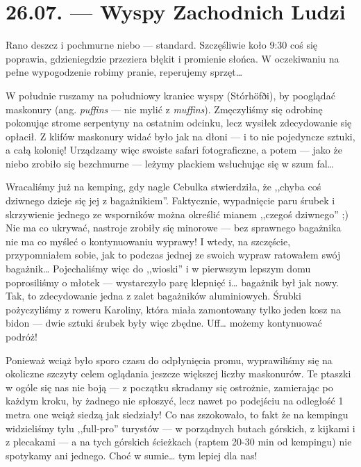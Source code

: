 \chapter*{26.07. --- Wyspy Zachodnich Ludzi}

Rano deszcz i pochmurne niebo --- standard. Szczęśliwie koło 9:30 coś się poprawia, gdzieniegdzie przeziera błękit i promienie słońca. W oczekiwaniu na pełne wypogodzenie robimy pranie, reperujemy sprzęt…


W południe ruszamy na południowy kraniec wyspy (Stórhöfði), by pooglądać maskonury (ang. \emph{puffins} --- nie mylić z \emph{muffins}). Zmęczyliśmy się odrobinę pokonując strome serpentyny na ostatnim odcinku, lecz wysiłek zdecydowanie się opłacił. Z klifów maskonury widać było jak na dłoni --- i to nie pojedyncze sztuki, a całą kolonię! Urządzamy więc swoiste safari fotograficzne, a potem --- jako że niebo zrobiło się bezchmurne --- leżymy plackiem wsłuchując się w szum fal…

Wracaliśmy już na kemping, gdy nagle Cebulka stwierdziła, że ,,chyba coś dziwnego dzieje się jej z bagażnikiem''. Faktycznie, wypadnięcie paru śrubek i skrzywienie jednego ze wsporników można określić mianem ,,czegoś dziwnego'' ;) Nie ma co ukrywać, nastroje zrobiły się minorowe --- bez sprawnego bagażnika nie ma co myśleć o kontynuowaniu wyprawy! I wtedy, na szczęście, przypomniałem sobie, jak to podczas jednej ze swoich wypraw ratowałem swój bagażnik… Pojechaliśmy więc do ,,wioski'' i  w pierwszym lepszym domu poprosiliśmy o młotek --- wystarczyło parę klepnięć i… bagażnik był jak nowy. Tak, to zdecydowanie jedna z zalet bagażników aluminiowych. Śrubki pożyczyliśmy z roweru Karoliny, która miała zamontowany tylko jeden kosz na bidon --- dwie sztuki śrubek były więc zbędne. Uff… możemy kontynuować podróż!

Ponieważ wciąż było sporo czasu do odpłynięcia promu, wyprawiliśmy się na okoliczne szczyty celem oglądania jeszcze większej liczby maskonurów. Te ptaszki w ogóle się nas nie boją --- z początku skradamy się ostrożnie, zamierając po każdym kroku, by żadnego nie spłoszyć, lecz nawet po podejściu na odległość 1 metra one wciąż siedzą jak siedziały! Co nas zszokowało, to fakt że na kempingu widzieliśmy tylu ,,full-pro'' turystów --- w porządnych butach górskich, z kijkami i z plecakami --- a na tych górskich ścieżkach (raptem 20-30 min od kempingu) nie spotykamy ani jednego. Choć w sumie… tym lepiej dla nas!

